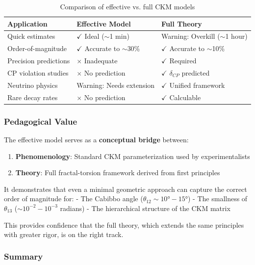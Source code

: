 \begin{table}[h]
\centering
\begin{tabular}{p{3.5cm}p{4.5cm}p{4.5cm}}
\hline
\textbf{Application} & \textbf{Effective Model} & \textbf{Full Theory} \\
\hline
Quick estimates & $\checkmark$ Ideal ($\sim$1 min) & Warning: Overkill ($\sim$1 hour) \\
Order-of-magnitude & $\checkmark$ Accurate to $\sim$30\% & $\checkmark$ Accurate to $\sim$10\% \\
Precision predictions & $\times$ Inadequate & $\checkmark$ Required \\
CP violation studies & $\times$ No prediction & $\checkmark$ $\delta_{CP}$ predicted \\
Neutrino physics & Warning: Needs extension & $\checkmark$ Unified framework \\
Rare decay rates & $\times$ No prediction & $\checkmark$ Calculable \\
\hline
\end{tabular}
\caption{Comparison of effective vs. full CKM models}
\end{table}

\subsubsection{Pedagogical Value}

The effective model serves as a \textbf{conceptual bridge} between:

\begin{enumerate}
    \item \textbf{Phenomenology}: Standard CKM parameterization used by experimentalists
    \item \textbf{Theory}: Full fractal-torsion framework derived from first principles
\end{enumerate}

It demonstrates that even a minimal geometric approach can capture the correct order of magnitude for:
- The Cabibbo angle ($\theta_{12} \sim 10°-15°$)
- The smallness of $\theta_{13}$ ($\sim 10^{-2}-10^{-3}$ radians)
- The hierarchical structure of the CKM matrix

This provides confidence that the full theory, which extends the same principles with greater rigor, is on the right track.

\subsubsection{Summary}

